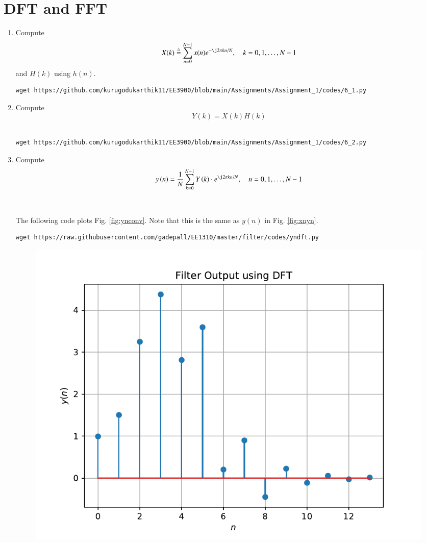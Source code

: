 \documentclass[journal,12pt,twocolumn]{IEEEtran}
\renewcommand\thesection{\arabic{section}}
\begin{document}
\section{DFT and FFT}
\begin{enumerate}[label=\thesection.\arabic*]
\item
Compute
\begin{equation}
X(k) \define \sum _{n=0}^{N-1}x(n) e^{-\j2\pi kn/N}, \quad k = 0,1,\dots, N-1
	\end{equation}
and $H(k)$ using $h(n)$.\\
\solution
\begin{lstlisting}
wget https://github.com/kurugodukarthik11/EE3900/blob/main/Assignments/Assignment_1/codes/6_1.py
\end{lstlisting}
\item Compute 
\begin{equation}
Y(k) = X(k)H(k)
\end{equation}
\\
\solution
\bigskip
\begin{lstlisting}
wget https://github.com/kurugodukarthik11/EE3900/blob/main/Assignments/Assignment_1/codes/6_2.py
\end{lstlisting}
\item Compute
\begin{equation}
 y\brak{n}={\frac {1}{N}}\sum _{k=0}^{N-1}Y\brak{k}\cdot e^{\j 2\pi kn/N},\quad n = 0,1,\dots, N-1
\end{equation}
\\
\\
\solution The following code plots Fig. \ref{fig:ynconv}. Note that this is the same as 
$y(n)$ in  Fig. 
\ref{fig:xnyn}. 
%
\begin{lstlisting}
wget https://raw.githubusercontent.com/gadepall/EE1310/master/filter/codes/yndft.py
\end{lstlisting}
\begin{figure}[!ht]
\centering
\includegraphics[width=\columnwidth]{./figs/yndft}

\end{figure}
\end{enumerate}
\end{document}
